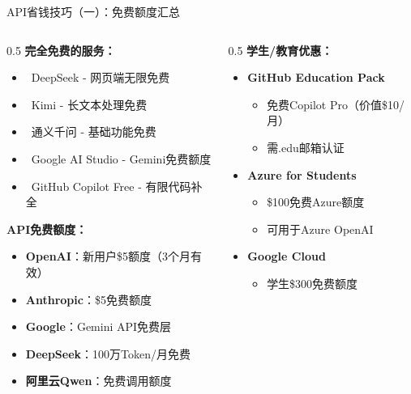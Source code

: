 \documentclass[aspectratio=169,11pt]{beamer}
\begin{document}
\begin{frame}{API省钱技巧（一）：免费额度汇总}
    \begin{columns}
        \begin{column}{0.5\textwidth}
            \textbf{完全免费的服务：}
            \begin{itemize}
                \item \textcolor{green!60!black}{\faStar\ DeepSeek} - 网页端无限免费
                \item \textcolor{green!60!black}{\faStar\ Kimi} - 长文本处理免费
                \item \textcolor{green!60!black}{\faStar\ 通义千问} - 基础功能免费
                \item \textcolor{green!60!black}{\faStar\ Google AI Studio} - Gemini免费额度
                \item \textcolor{green!60!black}{\faStar\ GitHub Copilot Free} - 有限代码补全
            \end{itemize}
            
            \vspace{0.3cm}
            \textbf{API免费额度：}
            \begin{itemize}
                \item \textbf{OpenAI}：新用户\$5额度（3个月有效）
                \item \textbf{Anthropic}：\$5免费额度
                \item \textbf{Google}：Gemini API免费层
                \item \textbf{DeepSeek}：100万Token/月免费
                \item \textbf{阿里云Qwen}：免费调用额度
            \end{itemize}
        \end{column}
        \begin{column}{0.5\textwidth}
            \textbf{学生/教育优惠：}
            \begin{itemize}
                \item \textbf{GitHub Education Pack}
                    \begin{itemize}
                        \item 免费Copilot Pro（价值\$10/月）
                        \item 需.edu邮箱认证
                    \end{itemize}
                \item \textbf{Azure for Students}
                    \begin{itemize}
                        \item \$100免费Azure额度
                        \item 可用于Azure OpenAI
                    \end{itemize}
                \item \textbf{Google Cloud}
                    \begin{itemize}
                        \item 学生\$300免费额度
                    \end{itemize}
            \end{itemize}
            

\end{column}
\end{columns}
\end{frame}
\end{document}
